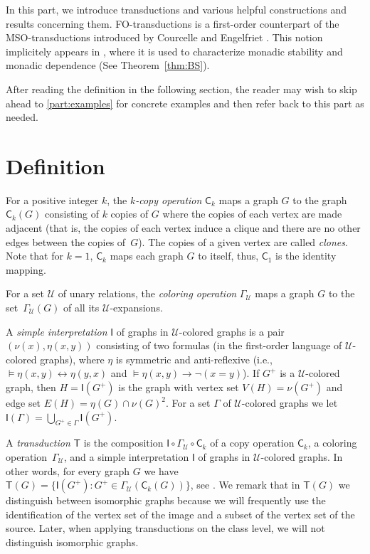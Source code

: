 \documentclass{lmcs}
\newcommand{\Uu}{\mathcal{U}}
\theoremstyle{definition}
\begin{document}
In this part, we introduce transductions and various helpful constructions and results concerning them. 
FO-transductions is a first-order counterpart of the MSO-transductions introduced by Courcelle and Engelfriet \cite{courcelle2012graph}. This notion implicitely appears in \cite{baldwin1985second}, where it is used to characterize monadic stability and monadic dependence (See Theorem~\ref{thm:BS}).

After reading the definition in the following section, the reader may wish to skip ahead to \cref{part:examples} for concrete examples and then refer back to this part as needed.
\section{Definition} \label{sec:transDef}
For a positive integer $k$, the \emph{$k$-copy operation}
$\mathsf{C}_k$ maps a graph $G$ to the graph~$\mathsf{C}_k(G)$
consisting of $k$ copies of $G$ where the copies of each vertex are
made adjacent (that is, the copies of each vertex induce a clique and
there are no other edges between the copies of~$G$). The copies of a given vertex are called \emph{clones}. 
Note that for $k=1$, $\mathsf C_k$ maps each graph $G$ to itself, thus, $\mathsf C_1$ is the identity mapping.

For a set ${\mathcal U}$ of unary relations, the \emph{coloring operation} $\Gamma_{\mathcal U}$ maps a graph $G$ to the set~$\Gamma_{\mathcal U}(G)$ of all its ${\mathcal U}$-expansions.

A \emph{simple  interpretation} $\mathsf I$ of graphs in \mbox{$\Uu$-colored}
graphs is a pair $(\nu(x), \eta(x,y))$ consisting of two formulas (in
the first-order language of $\Uu$-colored graphs), where $\eta$ is symmetric
and anti-reflexive (i.e.,
\mbox{$\models \eta(x,y)\leftrightarrow\eta(y,x)$} and
\mbox{$\models \eta(x,y)\rightarrow\neg(x=y)$}). If $G^+$ is a
$\Uu$-colored graph, then $H=\mathsf I(G^+)$ is the graph with
vertex set $V(H)=\nu(G^+)$ and edge set $E(H)=\eta(G)\cap \nu(G)^2$.
For a set $\Gamma$ of $\Uu$-colored graphs we let $\mathsf{I}(\Gamma)=\bigcup_{G^+\in \Gamma}\mathsf{I}(G^+)$. 

A \emph{transduction} $\mathsf T$ is the composition
$\mathsf I\circ\Gamma_{\mathcal U}\circ \mathsf C_k$ of a copy operation $\mathsf C_k$, a coloring operation~$\Gamma_{\mathcal U}$, and a simple interpretation $\mathsf I$ of graphs in $\Uu$-colored graphs.
In other words, for every graph $G$ we have
$\mathsf T(G)=\{\mathsf I(G^+): G^+\in\Gamma_{\mathcal U}(\mathsf C_k(G))\}$, see . We remark that in $\mathsf{T}(G)$ we distinguish between isomorphic graphs because we will frequently use the identification of the vertex set of the image and a subset of the vertex set of the source. Later, when applying transductions on the class level, we will not distinguish isomorphic graphs. 
\end{document}
